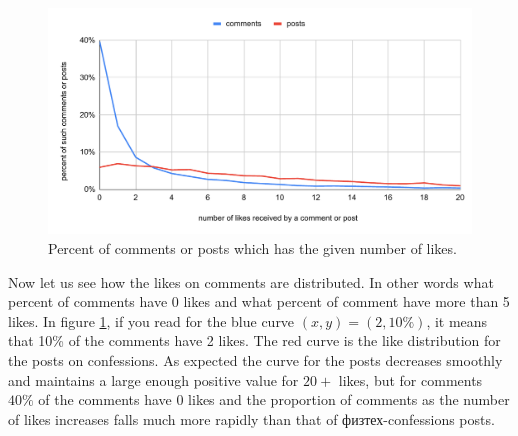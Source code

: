 \documentclass[
	12pt
] {article}
\begin{document}
	\begin{figure}[H]
		\centering
		\includegraphics[width=1\textwidth]{fig-proportion-of-posts-or-comments-with-certain-likes}
		\caption{Percent of comments or posts which has the given number of likes.}
		\label{fig-proportion-of-posts-or-comments-with-certain-likes}
	\end{figure}
	Now let us see how the likes on comments are distributed. In other words what percent of comments have 0 likes and what percent of comment have more than 5 likes. In figure \ref{fig-proportion-of-posts-or-comments-with-certain-likes}, if you read for the blue curve $(x, y) = (2, 10\%)$, it means that \num{10}\% of the comments have \num{2} likes. The red curve is the like distribution for the posts on confessions. As expected the curve for the posts decreases smoothly and maintains a large enough positive value for $\num{20} + $ likes, but for comments $\num{40}\%$ of the comments have 0 likes and the proportion of comments as the number of likes increases falls much more rapidly than that of физтех-confessions posts.
\end{document}
